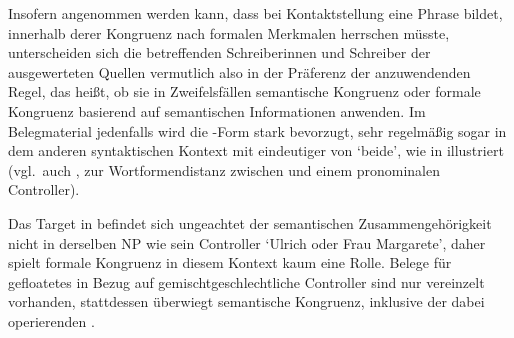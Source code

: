 Insofern angenommen werden kann, dass  bei Kontaktstellung eine
Phrase bildet, innerhalb derer Kongruenz nach formalen Merkmalen herrschen
müsste, unterscheiden sich die betreffenden Schreiberinnen und Schreiber der
ausgewerteten Quellen vermutlich also in der Präferenz der anzuwendenden Regel,
das heißt, ob sie in Zweifelsfällen semantische Kongruenz oder
formale Kongruenz basierend auf semantischen Informationen anwenden. Im
Belegmaterial jedenfalls wird die -Form stark bevorzugt, sehr
regelmäßig sogar in dem anderen syntaktischen Kontext mit eindeutiger
 von `beide', wie in
 illustriert (vgl.~auch
,  zur
Wortformendistanz zwischen  und einem
pronominalen Controller).

\begin{exe}
\end{exe}

Das Target  in  befindet sich
ungeachtet der semantischen Zusammengehörigkeit nicht in derselben NP wie sein
Controller  `Ulrich oder Frau Margarete', daher
spielt formale Kongruenz in diesem Kontext kaum eine Rolle. Belege für
gefloatetes  in Bezug auf
gemischtgeschlechtliche Controller sind nur vereinzelt vorhanden, stattdessen
überwiegt semantische Kongruenz, inklusive der dabei operierenden .

